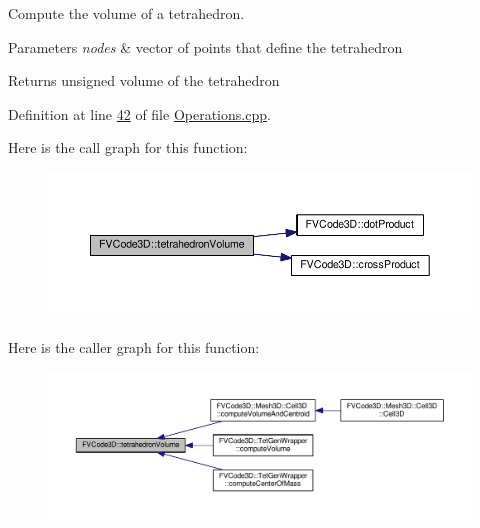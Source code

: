 Compute the volume of a tetrahedron. 


\begin{DoxyParams}{Parameters}
{\em nodes} & vector of points that define the tetrahedron \\
\hline
\end{DoxyParams}
\begin{DoxyReturn}{Returns}
unsigned volume of the tetrahedron 
\end{DoxyReturn}


Definition at line \hyperlink{Operations_8cpp_source_l00042}{42} of file \hyperlink{Operations_8cpp_source}{Operations.\+cpp}.



Here is the call graph for this function\+:
\nopagebreak
\begin{figure}[H]
\begin{center}
\leavevmode
\includegraphics[width=350pt]{namespaceFVCode3D_a8a6b07162e2801b628c3bd4057b9f221_cgraph}
\end{center}
\end{figure}




Here is the caller graph for this function\+:
\nopagebreak
\begin{figure}[H]
\begin{center}
\leavevmode
\includegraphics[width=350pt]{namespaceFVCode3D_a8a6b07162e2801b628c3bd4057b9f221_icgraph}
\end{center}
\end{figure}


